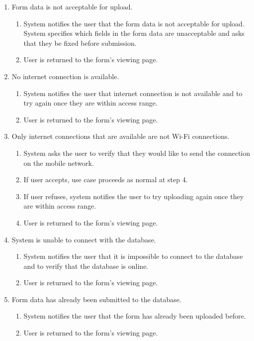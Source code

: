 \documentclass[twoside,letterpaper]{article}
\begin{document}
\begin{enumerate}
\item Form data is not acceptable for upload.
\begin{enumerate}
\item System notifies the user that the form data is not acceptable for upload. System 
specifies which fields in the form data are unacceptable and asks that they be fixed before submission.
\item User is returned to the form's viewing page.
\end{enumerate}

\item No internet connection is available.
\begin{enumerate}
\item System notifies the user that internet connection is not available and to try again once they are within access range.
\item User is returned to the form's viewing page.
\end{enumerate}

\item Only internet connections that are available are not Wi-Fi connections.
\begin{enumerate}
\item System asks the user to verify that they would like to send the connection on the mobile network.
\item If user accepts, use case proceeds as normal at step 4.
\item If user refuses, system notifies the user to try uploading again once they are within access range.
\item User is returned to the form's viewing page.
\end{enumerate}

\item System is unable to connect with the database.
\begin{enumerate}
\item System notifies the user that it is impossible to connect to the database and to verify that the database is online.
\item User is returned to the form's viewing page.
\end{enumerate}

\item Form data has already been submitted to the database.
\begin{enumerate}
\item System notifies the user that the form has already been uploaded before.
\item User is returned to the form's viewing page.
\end{enumerate}


\end{enumerate}
\end{document}
